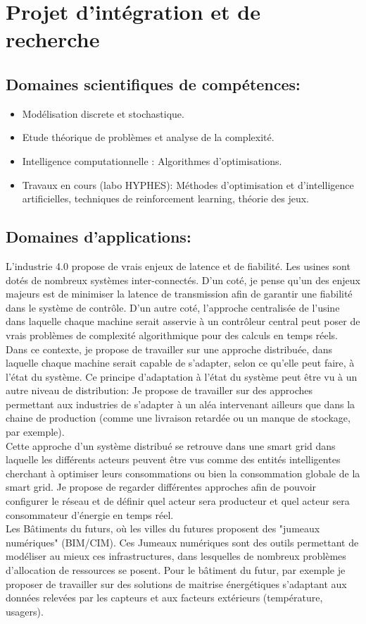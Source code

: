 \documentclass[a4paper,10pt]{article}
\begin{document}
\section{Projet d'intégration et de recherche}
\subsection{Domaines scientifiques de compétences:}
\begin{itemize}
\item Modélisation discrete et stochastique.
\item Etude théorique de problèmes et analyse de la complexité.
\item Intelligence computationnelle : Algorithmes d'optimisations.
\item Travaux en cours (labo HYPHES): Méthodes d'optimisation et d'intelligence artificielles, techniques de reinforcement learning, théorie des jeux.
\end{itemize}
\subsection{Domaines d'applications:}

L'industrie 4.0 propose de vrais enjeux de latence et de fiabilité. Les usines sont dotés de nombreux systèmes inter-connectés. D'un coté, je pense qu'un des enjeux majeurs est de minimiser la latence de transmission afin de garantir une fiabilité dans le système de contrôle. D'un autre coté, l'approche centralisée de l'usine dans laquelle chaque machine serait asservie à un contrôleur central peut poser de vrais problèmes de complexité algorithmique pour des calculs en temps réels. Dans ce contexte, je propose de travailler sur une approche distribuée, dans laquelle chaque machine serait capable de s'adapter, selon ce qu'elle peut faire, à l'état du système.
Ce principe d'adaptation à l'état du système peut être vu à un autre niveau de distribution: Je propose de travailler sur des approches permettant aux industries de s'adapter à un aléa intervenant ailleurs que dans la chaine de production (comme une livraison retardée ou un manque de stockage, par exemple).\\
\newline
Cette approche d'un système distribué se retrouve dans une smart grid dans laquelle les différents acteurs peuvent être vus comme des entités intelligentes cherchant à optimiser leurs consommations ou bien la consommation globale de la smart grid. Je propose de regarder différentes approches afin de pouvoir configurer le réseau et de définir quel acteur sera producteur et quel acteur sera consommateur d'énergie en temps réel.\\
\newline
Les Bâtiments du futurs, où les villes du futures proposent des "jumeaux numériques" (BIM/CIM). Ces Jumeaux numériques sont des outils permettant de modéliser au mieux ces infrastructures, dans lesquelles de nombreux problèmes d'allocation de ressources se posent. Pour le bâtiment du futur, par exemple je proposer de travailler sur des solutions de maitrise énergétiques s'adaptant aux données relevées par les capteurs et aux facteurs extérieurs (température, usagers).
\end{document}
